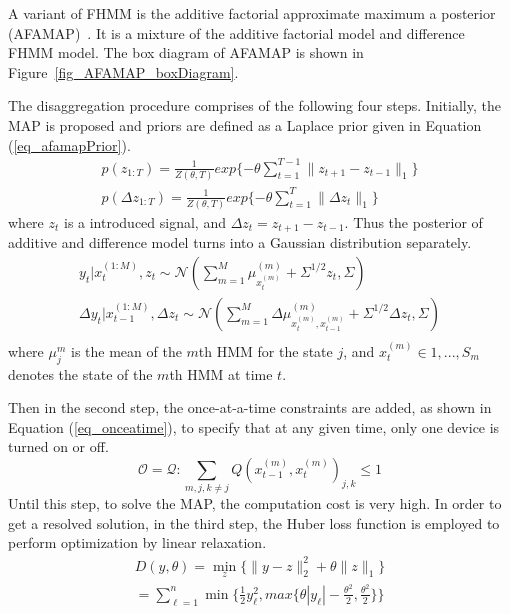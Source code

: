 A variant of FHMM is the additive factorial approximate maximum a posterior (AFAMAP)~\cite{kolter2012aistat}.
It is a mixture of the additive factorial model and
difference FHMM model.
The box diagram of AFAMAP is shown in Figure~\ref{fig_AFAMAP_boxDiagram}.

The disaggregation procedure comprises of the following four steps. 
Initially, the MAP is proposed and
priors are defined as a Laplace prior given in Equation (\ref{eq_afamapPrior}).
\begin{equation}
\label{eq_afamapPrior}
\begin{aligned}
p(z_{1:T})= \frac{1}{Z(\theta,T)}exp\{-\theta \sum_{t=1}^{T-1} \lVert z_{t+1}-z_{t-1}\rVert_1\} \\
p(\Delta z_{1:T})=\frac{1}{Z(\theta,T)}exp\{-\theta \sum_{t=1}^{T}\lVert \Delta z_t \rVert_1\}
\end{aligned}
\end{equation}
where $z_t$ is a introduced signal, and $\Delta z_t = z_{t+1}-z_{t-1}$.
Thus the posterior of additive and difference model turns into a Gaussian distribution 
separately. 
\begin{equation}
\begin{aligned}
y_t|x_t^{(1:M)},z_t\sim \mathcal{N}(\sum_{m=1}^{M}\mu_{x_t^{(m)}}^{(m)}+\Sigma^{1/2}{z_t},\Sigma)\\
\Delta y_t|x_{t-1}^{(1:M)},\Delta z_t\sim \mathcal{N}(\sum_{m=1}^{M}\Delta \mu^{(m)}_{x_t^{(m)},x_{t-1}^{(m)}}+\Sigma^{1/2}\Delta z_t,\Sigma)\\
\end{aligned}
\end{equation}
where $\mu_j^m$ is the mean of the $m$th HMM for the state $j$, 
and $x_t^{(m)} \in {1,...,S_m}$ denotes the state of the $m$th HMM at time $t$. 

Then in the second step, the once-at-a-time constraints are added, as shown in Equation (\ref{eq_onceatime}), to specify that at any given time, 
only one device is turned on or off. 
\begin{equation}
\label{eq_onceatime}
\mathcal{O} = {\mathcal{Q}: \sum_{m,j,k \neq j} Q(x_{t-1}^{(m)},x_t^{(m)})_{j,k}\leq 1}
\end{equation}
Until this step, to solve the MAP, the computation cost is very high. 
In order to get a resolved solution, in the third step, the Huber loss function is employed to perform optimization by linear relaxation. 
\begin{equation}
\begin{aligned}
D(y,\theta)= \min_{z}\{\lVert y-z \rVert_2^2+ \theta \lVert z \rVert_1\} \\
= \sum_{\ell=1}^{n}\min\{\frac{1}{2}y_{\ell}^2,max\{\theta|y_{\ell}|-\frac{\theta^2}{2}, \frac{\theta^2}{2}\}\}
\end{aligned}
\end{equation}

